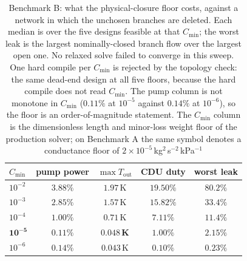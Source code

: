 \begin{table}[t]\centering\caption{Benchmark B: what the physical-closure floor costs, against a network in
which the unchosen branches are deleted.  Each median is over the five designs
feasible at that $C_{\min}$; the worst leak is the largest nominally-closed branch
flow over the largest open one.  No relaxed solve failed to converge in this sweep.  One hard compile per
$C_{\min}$ is rejected by the topology check: the same dead-end
design at all five floors, because the hard compile does not read $C_{\min}$.  The
pump column is not monotone in $C_{\min}$ ($0.11\%$ at $10^{-5}$ against $0.14\%$
at $10^{-6}$), so the floor is an order-of-magnitude statement.  The $C_{\min}$
column is the dimensionless length and minor-loss weight floor of the production
solver; on Benchmark A the same symbol denotes a conductance floor of
$2\times10^{-5}$\,kg$^2$\,s$^{-2}$\,kPa$^{-1}$}\label{tab:closure}
\fontsize{7.2}{8.4}\selectfont\setlength{\tabcolsep}{3pt}
\begin{tabular}{@{}lcccc@{}}\toprule
$C_{\min}$ & pump power & $\max T_{\mathrm{out}}$ & CDU duty & worst leak\\\midrule
$10^{-2}$ & $3.88\%$ & $1.97$\,K & $19.50\%$ & $80.2\%$\\
$10^{-3}$ & $2.85\%$ & $1.57$\,K & $15.82\%$ & $33.4\%$\\
$10^{-4}$ & $1.00\%$ & $0.71$\,K & $7.11\%$ & $11.4\%$\\
$\mathbf{10^{-5}}$ & $\mathbf{0.11\%}$ & $\mathbf{0.048}$\,\textbf{K} & $\mathbf{1.00\%}$ & $2.15\%$\\
$10^{-6}$ & $0.14\%$ & $0.043$\,K & $0.10\%$ & $0.23\%$\\
\bottomrule\end{tabular}\end{table}

